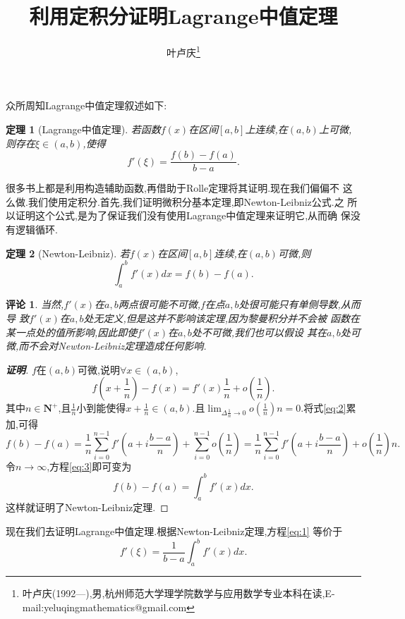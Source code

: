 \documentclass[a4paper]{article}
\newtheorem*{theo}{定理}
\newtheorem*{rem}{评论}
\newenvironment{theorem}
{\bigskip\begin{mdframed}\begin{theo}}
    {\end{theo}\end{mdframed}\bigskip}
\newenvironment{remark}
{\begin{mdframed}\begin{rem}}
    {\end{rem}\end{mdframed}\bigskip}
\begin{document}
\title{\huge{\bf{利用定积分证明Lagrange中值定理}}} \author{\small{叶卢庆\footnote{叶卢庆(1992---),男,杭州师范大学理学院数学与应用数学专业本科在读,E-mail:yeluqingmathematics@gmail.com}}}
\maketitle
众所周知Lagrange中值定理叙述如下:
\begin{theorem}[Lagrange中值定理]
  若函数$f(x)$在区间$[a,b]$上连续,在$(a,b)$上可微,则存在$\xi\in
  (a,b)$,使得
\begin{equation}\label{eq:1}
f'(\xi)=\frac{f(b)-f(a)}{b-a}.
\end{equation}
\end{theorem}
很多书上都是利用构造辅助函数,再借助于Rolle定理将其证明.现在我们偏偏不
这么做.我们使用定积分.首先,我们证明微积分基本定理,即Newton-Leibniz公式.之
所以证明这个公式,是为了保证我们没有使用Lagrange中值定理来证明它,从而确
保没有逻辑循环.
\begin{theorem}[Newton-Leibniz]
若$f(x)$在区间$[a,b]$连续,在$(a,b)$可微,则
$$
\int_a^bf'(x)dx=f(b)-f(a).
$$
\end{theorem}
\begin{remark}
当然,$f'(x)$在$a,b$两点很可能不可微,$f$在点$a,b$处很可能只有单侧导数,从而导
致$f'(x)$在$a,b$处无定义,但是这并不影响该定理,因为黎曼积分并不会被
函数在某一点处的值所影响,因此即使$f'(x)$在$a,b$处不可微,我们也可以假设
其在$a,b$处可微,而不会对Newton-Leibniz定理造成任何影响.
\end{remark}
\begin{proof}[\textbf{证明}]
$f$在$(a,b)$可微,说明$\forall x\in (a,b)$,
\begin{equation}\label{eq:2}
f(x+\frac{1}{n})-f(x)=f'(x)\frac{1}{n}+o(\frac{1}{n}).
\end{equation}
其中$n\in \mathbf{N}^+$,且$\frac{1}{n}$小到能使得$x+\frac{1}{n}\in (a,b)$.且$\lim_{\Delta \frac{1}{n}\to
  0}o(\frac{1}{n})n=0$.将式\eqref{eq:2}累加,可得
\begin{equation}\label{eq:3}
f(b)-f(a)=\frac{1}{n}\sum_{i=0}^{n-1} f'(a+i \frac{b-a}{n})+\sum_{i=0}^{n-1} o(\frac{1}{n})=\frac{1}{n}\sum_{i=0}^{n-1} f'(a+i \frac{b-a}{n})+o(\frac{1}{n})n.
\end{equation}
令$n\to\infty$,方程\eqref{eq:3}即可变为
\begin{equation}
  \label{eq:4}
  f(b)-f(a)=\int_a^bf'(x)dx.
\end{equation}
这样就证明了Newton-Leibniz定理.
\end{proof}
现在我们去证明Lagrange中值定理.根据Newton-Leibniz定理,方程\eqref{eq:1}
等价于
\begin{equation}
  \label{eq:5}
f'(\xi)=\frac{1}{b-a}\int_a^bf'(x)dx.
\end{equation}
\end{document}
